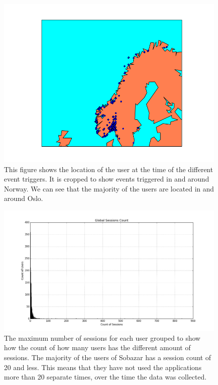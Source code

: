     \begin{figure}[H]
        \includegraphics[width=5in]{image/simpleGeoPlot.png}
        \centering
        \caption[Simple plotting of event location]{This figure shows the location of the user at the time of the different event triggers.
        It is cropped to show events triggered in and around Norway.
        We can see that the majority of the users are located in and around Oslo.}
        \label{figure:croppedGeoplot}
    \end{figure}
    \begin{figure}[H]
        \includegraphics[width=5in]{image/sessionsCount.png}
        \centering
        \caption[Total max session count for the users]{The maximum number of sessions for each user grouped to show how the count of how many users has the different amount of sessions.
        The majority of the users of Sobazar has a session count of 20 and less.
        This means that they have not used the applications more than 20 separate times, over the time the data was collected.}
    \end{figure}


